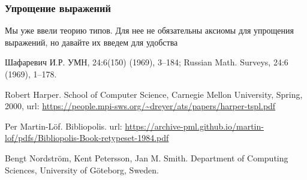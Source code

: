 \documentclass[openany]{book}
\theoremstyle{plain}
\theoremstyle{definition}
\begin{document}
\subsubsection{Упрощение выражений}

Мы уже ввели теорию типов. Для нее не обязательны аксиомы для упрощения выражений, но давайте их введем для удобства

\begin{thebibliography}{2}

    Шафаревич И.Р.
    \newblock УМН, 24:6(150) (1969), 3–184; Russian Math. Surveys, 24:6 (1969), 1–178.

    Robert Harper.
    \newblock School of Computer Science, Carnegie Mellon University, Spring, 2000,
    \newblock url: \url{https://people.mpi-sws.org/~dreyer/ats/papers/harper-tspl.pdf}

    Per Martin-L\"{o}f.
    \newblock Bibliopolis.
    \newblock url: \url{https://archive-pml.github.io/martin-lof/pdfs/Bibliopolis-Book-retypeset-1984.pdf}

    Bengt Nordstr\"{o}m, Kent Petersson, Jan M. Smith.
    \newblock Department of Computing Sciences, University of G\"{o}teborg, Sweden.

\end{thebibliography}
\end{document}
